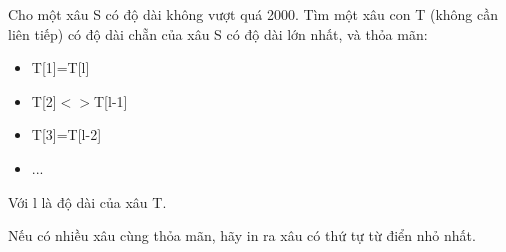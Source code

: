 Cho một xâu S có độ dài không vượt quá 2000. Tìm một xâu con T (không cần liên tiếp) có độ dài chẵn của xâu S có độ dài lớn nhất, và thỏa mãn:  
\begin{itemize}
	\item     T[1]=T[l]   
	\item     T[2]$<$$>$T[l-1]   
	\item     T[3]=T[l-2]   
	\item     ...   
\end{itemize}

   Với l là độ dài của xâu T.  

   Nếu có nhiều xâu cùng thỏa mãn, hãy in ra xâu có thứ tự từ điển nhỏ nhất.  

\